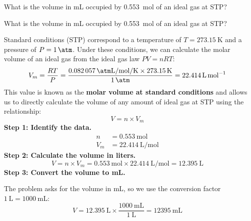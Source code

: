 \begin{exercise}
    What is the volume in mL occupied by \qty{0.553}{\mol} of an ideal gas at STP?
    \begin{solu}
        What is the volume in mL occupied by \qty{0.553}{\mol} of an ideal gas at STP?

        Standard conditions (STP) correspond to a temperature of $T = \qty{273.15}{\kelvin}$
        and a pressure of $P = \qty{1}{\atm}$. Under these conditions, we can calculate the
        molar volume of an ideal gas from the ideal gas law $PV = nRT$:
        \begin{equation*}
            V_m = \frac{RT}{P} = \frac{\qty{0.082057}{\atm\liter\per\mol\per\kelvin}
            \times \qty{273.15}{\kelvin}}{\qty{1}{\atm}} = \qty{22.414}{\liter\per\mol}
        \end{equation*}
        This value is known as the \textbf{molar volume at standard conditions} and allows
        us to directly calculate the volume of any amount of ideal gas at STP using the
        relationship:
        \begin{equation*}
            V = n \times V_m
        \end{equation*}
        \textbf{Step 1: Identify the data.}
        \begin{align*}
            n   &= \qty{0.553}{\mol} \\
            V_m &= \qty{22.414}{\liter\per\mol}
        \end{align*}
        \textbf{Step 2: Calculate the volume in liters.}
        \begin{equation*}
            V = n \times V_m = \qty{0.553}{\mol} \times \qty{22.414}{\liter\per\mol}
            = \qty{12.395}{\liter}
        \end{equation*}
        \textbf{Step 3: Convert the volume to mL.}

        The problem asks for the volume in mL, so we use the conversion factor
        $\qty{1}{\liter} = \qty{1000}{\mL}$:
        \begin{equation*}
            V = \qty{12.395}{\liter} \times \frac{\qty{1000}{\mL}}{\qty{1}{\liter}}
            = \boxed{\qty{12395}{\mL}}
        \end{equation*}
    \end{solu}
\end{exercise}
